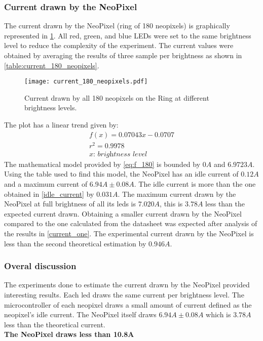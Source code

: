 \subsubsection{Current drawn by the NeoPixel}\label{current_180}
The current drawn by the NeoPixel (ring of 180 neopixels) is graphically represented in \cref{fig:current_180_neopixels}. All red, green, and blue LEDs were set to the same brightness level to reduce the complexity of the experiment. The current values were obtained by averaging the results of three sample per brightness as shown in \cref{table:current_180_neopixels}. 
\begin{figure}[ht]
	\centering
	\texttt{[image: current\_180\_neopixels.pdf]}
	\caption{Current drawn by all 180 neopixels on the Ring at different brightness levels.}
	\label{fig:current_180_neopixels}
\end{figure}
The plot has a linear trend given by:
\begin{equation}
\label{eq:f_180}
\begin{multlined}
f(x) = 0.07043x-0.0707 \\
r^2 = 0.9978\\
\textit{$x$: brightness level}
\end{multlined}
\end{equation} 
The mathematical model provided by \cref{eq:f_180} is bounded by $0A$ and $6.9723A$. Using the table used to find this model, the NeoPixel has an idle current of $0.12A$ and a maximum current of $6.94A \pm 0.08 A$. The idle current is more than the one obtained in \cref{idle_current} by $0.031A$. The maximum current drawn by the NeoPixel at full brightness of all its leds is $7.020A$, this is $3.78A$ less than the expected current drawn. Obtaining a smaller current drawn by the NeoPixel compared to the one calculated from the datasheet  was expected after analysis of the results in \cref{current_one}. The experimental current drawn by the NeoPixel is less than the second theoretical estimation by $0.946A$.

\subsubsection{Overal discussion}
The experiments done to estimate the current drawn by the NeoPixel provided interesting results. Each led draws the same current per brightness level. The microcontroller of each neopixel draws a small amount of current defined as the neopixel's idle current. The NeoPixel itself draws $6.94A \pm 0.08 A$ which is $3.78A$ less than the theoretical current.\\
\textbf{The NeoPixel draws less than 10.8A}


